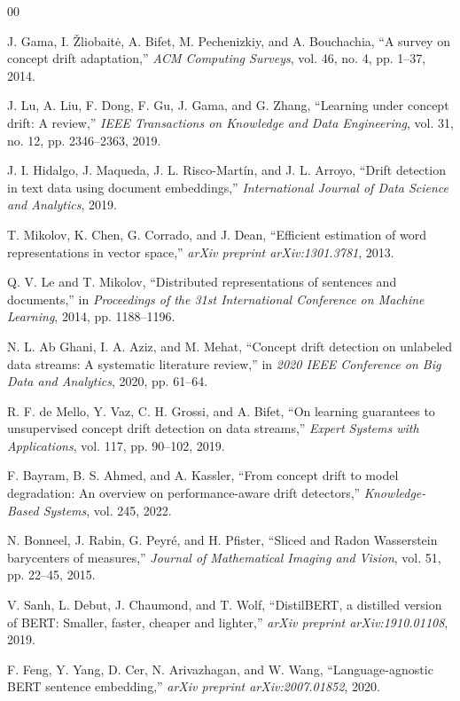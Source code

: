\documentclass[conference]{IEEEtran}
\begin{document}
\begin{thebibliography}{00}

J. Gama, I. Žliobaitė, A. Bifet, M. Pechenizkiy, and A. Bouchachia,
``A survey on concept drift adaptation,''
\textit{ACM Computing Surveys}, vol. 46, no. 4, pp. 1--37, 2014.

J. Lu, A. Liu, F. Dong, F. Gu, J. Gama, and G. Zhang,
``Learning under concept drift: A review,''
\textit{IEEE Transactions on Knowledge and Data Engineering}, vol. 31, no. 12, pp. 2346--2363, 2019.

J. I. Hidalgo, J. Maqueda, J. L. Risco-Martín, and J. L. Arroyo,
``Drift detection in text data using document embeddings,''
\textit{International Journal of Data Science and Analytics}, 2019.

T. Mikolov, K. Chen, G. Corrado, and J. Dean,
``Efficient estimation of word representations in vector space,''
\textit{arXiv preprint arXiv:1301.3781}, 2013.

Q. V. Le and T. Mikolov,
``Distributed representations of sentences and documents,''
in \textit{Proceedings of the 31st International Conference on Machine Learning}, 2014, pp. 1188--1196.

N. L. Ab Ghani, I. A. Aziz, and M. Mehat,
``Concept drift detection on unlabeled data streams: A systematic literature review,''
in \textit{2020 IEEE Conference on Big Data and Analytics}, 2020, pp. 61--64.

R. F. de Mello, Y. Vaz, C. H. Grossi, and A. Bifet,
``On learning guarantees to unsupervised concept drift detection on data streams,''
\textit{Expert Systems with Applications}, vol. 117, pp. 90--102, 2019.

F. Bayram, B. S. Ahmed, and A. Kassler,
``From concept drift to model degradation: An overview on performance-aware drift detectors,''
\textit{Knowledge-Based Systems}, vol. 245, 2022.

N. Bonneel, J. Rabin, G. Peyré, and H. Pfister,
``Sliced and Radon Wasserstein barycenters of measures,''
\textit{Journal of Mathematical Imaging and Vision}, vol. 51, pp. 22--45, 2015.

V. Sanh, L. Debut, J. Chaumond, and T. Wolf,
``DistilBERT, a distilled version of BERT: Smaller, faster, cheaper and lighter,''
\textit{arXiv preprint arXiv:1910.01108}, 2019.

F. Feng, Y. Yang, D. Cer, N. Arivazhagan, and W. Wang,
``Language-agnostic BERT sentence embedding,''
\textit{arXiv preprint arXiv:2007.01852}, 2020.


\end{thebibliography}
\end{document}

